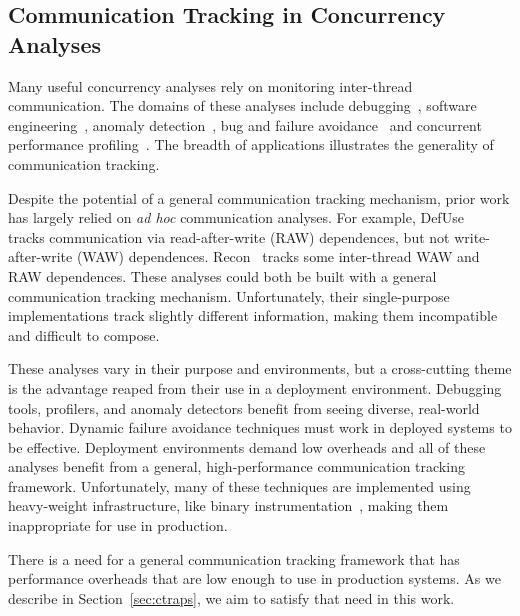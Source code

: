 \documentclass[preprint,9pt]{sigplanconf}
\begin{document}
\subsection{Communication Tracking in Concurrency Analyses}
\label{sec:background:comm}

Many useful concurrency analyses rely on monitoring inter-thread
communication.  The domains of these analyses include 
debugging~\cite{defuse,conseq,recon,bugaboo,raceslicing,fasttrack,falcon},
software engineering~\cite{oshajava,oshatr}, anomaly
detection~\cite{avio,dmtracker,cci,daikon}, bug and failure
avoidance~\cite{aviso,cfix} and concurrent performance
profiling~\cite{threadcriticality,schedpredictionmodel}.  The breadth of
applications illustrates the generality of communication tracking.

Despite the potential of a general communication tracking mechanism, prior work
has largely relied on {\em ad hoc} communication analyses.  For example,
DefUse~\cite{defuse} tracks communication via read-after-write (RAW)
dependences, but not write-after-write (WAW) dependences.  Recon~\cite{recon}
tracks some inter-thread WAW and RAW dependences.  These analyses could both be
built with a general communication tracking mechanism.  Unfortunately, their
single-purpose implementations track slightly different information, making
them incompatible and difficult to compose.

These analyses vary in their purpose and environments, but a cross-cutting
theme is the advantage reaped from their use in a deployment environment.
Debugging tools, profilers, and anomaly detectors benefit from seeing diverse,
real-world behavior.  Dynamic failure avoidance techniques must work in
deployed systems to be effective.  Deployment environments demand low overheads
and all of these analyses benefit from a general, high-performance
communication tracking framework.  Unfortunately, many of these techniques are implemented using heavy-weight infrastructure, like binary instrumentation~\cite{pin}, making them inappropriate for use in production.  

There is a need for a general communication tracking framework that has
performance overheads that are low enough to use in production systems.  As we
describe in Section~\ref{sec:ctraps}, we aim to satisfy that need in this work.



\end{document}
